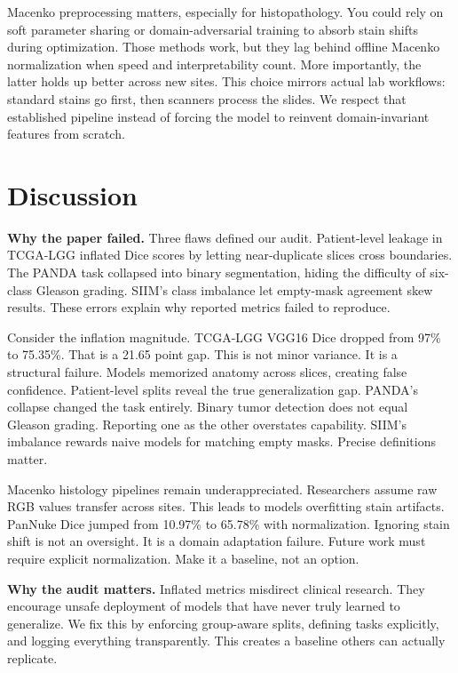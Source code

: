 \documentclass[conference,a4paper]{IEEEtran}
\begin{document}
Macenko preprocessing matters, especially for histopathology. You could rely on soft parameter sharing or domain-adversarial training to absorb stain shifts during optimization. Those methods work, but they lag behind offline Macenko normalization when speed and interpretability count. More importantly, the latter holds up better across new sites. This choice mirrors actual lab workflows: standard stains go first, then scanners process the slides. We respect that established pipeline instead of forcing the model to reinvent domain-invariant features from scratch.

\FloatBarrier

\section{Discussion}
\textbf{Why the paper failed.} Three flaws defined our audit. Patient-level leakage in TCGA-LGG inflated Dice scores by letting near-duplicate slices cross boundaries. The PANDA task collapsed into binary segmentation, hiding the difficulty of six-class Gleason grading. SIIM’s class imbalance let empty-mask agreement skew results. These errors explain why reported metrics failed to reproduce.

Consider the inflation magnitude. TCGA-LGG VGG16 Dice dropped from 97\% to 75.35\%. That is a 21.65 point gap. This is not minor variance. It is a structural failure. Models memorized anatomy across slices, creating false confidence. Patient-level splits reveal the true generalization gap. PANDA’s collapse changed the task entirely. Binary tumor detection does not equal Gleason grading. Reporting one as the other overstates capability. SIIM’s imbalance rewards naive models for matching empty masks. Precise definitions matter.

Macenko histology pipelines remain underappreciated. Researchers assume raw RGB values transfer across sites. This leads to models overfitting stain artifacts. PanNuke Dice jumped from 10.97\% to 65.78\% with normalization. Ignoring stain shift is not an oversight. It is a domain adaptation failure. Future work must require explicit normalization. Make it a baseline, not an option.

\textbf{Why the audit matters.} Inflated metrics misdirect clinical research. They encourage unsafe deployment of models that have never truly learned to generalize. We fix this by enforcing group-aware splits, defining tasks explicitly, and logging everything transparently. This creates a baseline others can actually replicate.
\end{document}
